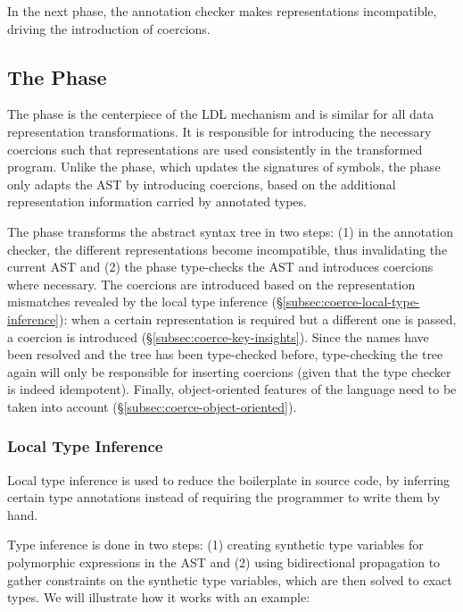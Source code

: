 In the next phase, the annotation checker makes representations incompatible, driving the introduction of coercions.

\subsection{The \Coerce{} Phase}
\label{sec:transform:coerce}

The \coerce{} phase is the centerpiece of the LDL mechanism and is similar for all data representation transformations. It is responsible for introducing the necessary coercions such that representations are used consistently in the transformed program. Unlike the \inject{} phase, which updates the signatures of symbols, the \coerce{} phase only adapts the AST by introducing coercions, based on the additional representation information carried by annotated types.

The \coerce{} phase transforms the abstract syntax tree in two steps: (1) in the annotation checker, the different representations become incompatible, thus invalidating the current AST and (2) the \coerce{} phase type-checks the AST and introduces coercions where necessary. The coercions are introduced based on the representation mismatches revealed by the local type inference (\S\ref{subsec:coerce-local-type-inference}): when a certain representation is required but a different one is passed, a coercion is introduced (\S\ref{subsec:coerce-key-insights}). Since the names have been resolved and the tree has been type-checked before, type-checking the tree again will only be responsible for inserting coercions (given that the type checker is indeed idempotent). Finally, object-oriented features of the language need to be taken into account (\S\ref{subsec:coerce-object-oriented}).

\subsubsection*{Local Type Inference}
\label{subsec:coerce-local-type-inference}

Local type inference \cite{odersky-colored-local-type-inf, pierce-local-type-inference} is used to reduce the boilerplate in source code, by inferring certain type annotations instead of requiring the programmer to write them by hand.

Type inference is done in two steps: (1) creating synthetic type variables for polymorphic expressions in the AST and (2) using bidirectional propagation to gather constraints on the synthetic type variables, which are then solved to exact types. We will illustrate how it works with an example:

